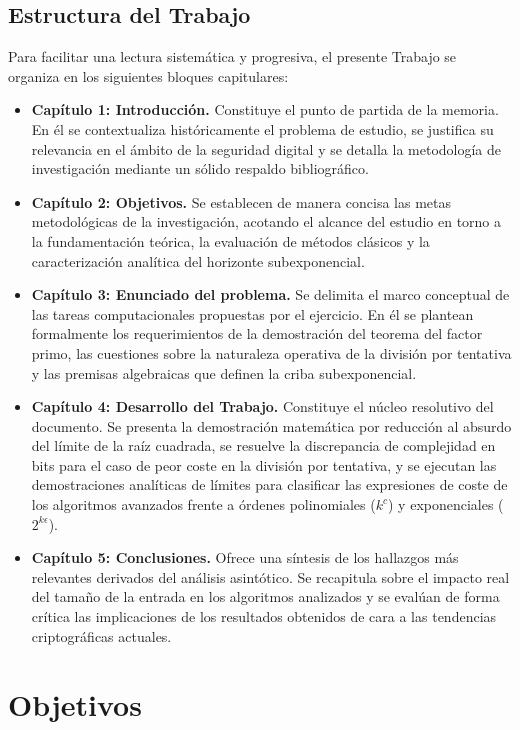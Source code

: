 \documentclass[11pt,a4paper,spanish]{book}
\begin{document}
\section{Estructura del Trabajo}
Para facilitar una lectura sistemática y progresiva, el presente Trabajo se organiza en los siguientes bloques capitulares:

\begin{itemize}
    \item \textbf{Capítulo 1: Introducción.} Constituye el punto de partida de la memoria. En él se contextualiza históricamente el problema de estudio, se justifica su relevancia en el ámbito de la seguridad digital y se detalla la metodología de investigación mediante un sólido respaldo bibliográfico.
    \item \textbf{Capítulo 2: Objetivos.} Se establecen de manera concisa las metas metodológicas de la investigación, acotando el alcance del estudio en torno a la fundamentación teórica, la evaluación de métodos clásicos y la caracterización analítica del horizonte subexponencial.
    \item \textbf{Capítulo 3: Enunciado del problema.} Se delimita el marco conceptual de las tareas computacionales propuestas por el ejercicio. En él se plantean formalmente los requerimientos de la demostración del teorema del factor primo, las cuestiones sobre la naturaleza operativa de la división por tentativa y las premisas algebraicas que definen la criba subexponencial.
    \item \textbf{Capítulo 4: Desarrollo del Trabajo.} Constituye el núcleo resolutivo del documento. Se presenta la demostración matemática por reducción al absurdo del límite de la raíz cuadrada, se resuelve la discrepancia de complejidad en bits para el caso de peor coste en la división por tentativa, y se ejecutan las demostraciones analíticas de límites para clasificar las expresiones de coste de los algoritmos avanzados frente a órdenes polinomiales ($k^c$) y exponenciales ($2^{k\epsilon}$).
    \item \textbf{Capítulo 5: Conclusiones.} Ofrece una síntesis de los hallazgos más relevantes derivados del análisis asintótico. Se recapitula sobre el impacto real del tamaño de la entrada en los algoritmos analizados y se evalúan de forma crítica las implicaciones de los resultados obtenidos de cara a las tendencias criptográficas actuales.
\end{itemize}\chapter{Objetivos}
\end{document}
